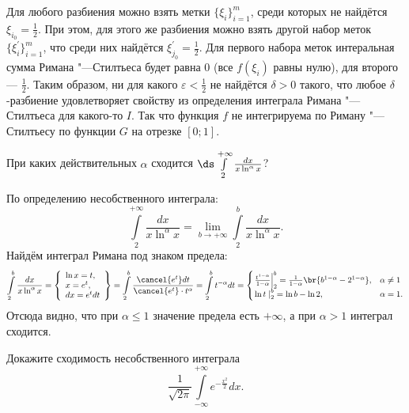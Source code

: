 \begin{solution}
    Для любого разбиения можно взять метки $\{\xi_i\}_{i = 1}^m$, среди которых не найдётся $\xi_{i_0} = \frac{1}{2}$. При этом, для этого же разбиения можно взять другой набор меток $\{\xi^\prime_i\}_{i = 1}^m$, что среди них найдётся $\xi^\prime_{j_0} = \frac{1}{2}$. Для первого набора меток интеральная сумма Римана "---Стилтьеса будет равна $0$ (все $f(\xi_i)$ равны нулю), для второго --- $\frac{1}{2}$. Таким образом, ни для какого $\varepsilon < \frac{1}{2}$ не найдётся $\delta > 0$ такого, что любое $\delta$-разбиение удовлетворяет свойству из определения интеграла Римана "---Стилтьеса для какого-то $I$. Так что функция $f$ не интегрируема по Риману "---Стилтьесу по функции $G$ на отрезке $[0; 1]$.
\end{solution}

\begin{problem}[31$^\circ$]
    При каких действительных $\alpha$ сходится $\ds\int\limits_2^{+\infty}\frac{dx}{x\ln^\alpha x}$?
\end{problem}

\begin{solution}
    По определению несобственного интеграла:
    \[
        \int\limits_2^{+\infty}\frac{dx}{x\ln^\alpha x} = \lim_{b \to +\infty}\int\limits_2^{b}\frac{dx}{x\ln^\alpha x}.
    \]
    Найдём интеграл Римана под знаком предела:
    \[
        \int\limits_2^b\frac{dx}{x\ln^\alpha x} =
        \left\{
            \begin{array}{l}
                \ln x = t,\\
                x = e^t,\\
                dx = e^tdt
            \end{array}
        \right\} = \int\limits_2^b\frac{\cancel{e^t}dt}{\cancel{e^t} \cdot t^\alpha} = \int\limits_2^bt^{-\alpha}dt =
    \begin{cases}
        \left.\frac{t^{1 - \alpha}}{1 - \alpha}\right|_2^b = \frac{1}{1 - \alpha}\br{b^{1 - \alpha} - 2^{1 - \alpha}},&\alpha \ne 1\\
        \left.\ln t\;\right|_2^b = \ln b - \ln 2,&\alpha = 1.
    \end{cases}
    \]
    Отсюда видно, что при $\alpha \leqslant 1$ значение предела есть $+\infty$, а при $\alpha > 1$ интеграл сходится.
\end{solution}

\begin{problem}[32$^\circ$]
    Докажите сходимость несобственного интеграла
    \[
        \frac{1}{\sqrt{2\pi}}\int\limits_{-\infty}^{+\infty}e^{-\frac{x^2}{2}}dx.
    \]
\end{problem}

